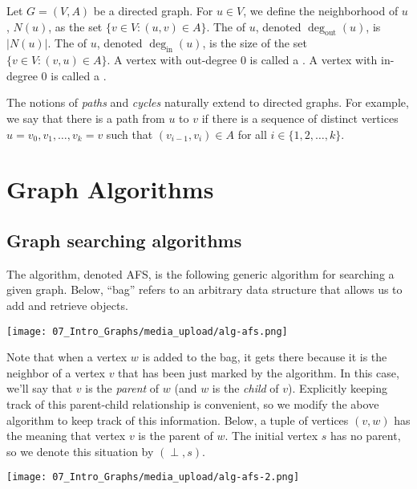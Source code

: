 \begin{definition} \label{definition:Neighborhood-out-degree-in-degree-sink-source} 
Let $G = (V,A)$ be a directed graph. For $u \in V$, we define the neighborhood of $u$, $N(u)$, as the set $\{v \in V : (u,v) \in A\}$. The  of $u$, denoted $\deg_\text{out}(u)$, is $|N(u)|$. The  of $u$, denoted $\deg_\text{in}(u)$, is the size of the set $\{v \in V : (v,u) \in A\}$. A vertex with out-degree 0 is called a . A vertex with in-degree 0 is called a .
\end{definition}


\begin{note} \label{note:Paths-and-cycles-in-directed-graphs}
The notions of \emph{paths} and \emph{cycles} naturally extend to directed graphs. For example, we say that there is a path from $u$ to $v$ if there is a sequence of distinct vertices $u = v_0,v_1,\ldots,v_k = v$ such that $(v_{i-1}, v_i) \in A$ for all $i \in \{1,2,\ldots,k\}$. 
\end{note}





\section{Graph Algorithms}

\subsection{Graph searching algorithms}


\begin{definition} \label{definition:Arbitrary-first-search-AFS-algorithm}
The  algorithm, denoted AFS, is the following generic algorithm for searching a given graph. Below, ``bag'' refers to an arbitrary data structure that allows us to add and retrieve objects. 

\begin{center}
    \texttt{[image: 07\_Intro\_Graphs/media\_upload/alg-afs.png]}
\end{center}

Note that when a vertex $w$ is added to the bag, it gets there because it is the neighbor of a vertex $v$ that has been just marked by the algorithm. In this case, we'll say that $v$ is the \emph{parent} of $w$ (and $w$ is the \emph{child} of $v$). Explicitly keeping track of this parent-child relationship is convenient, so we modify the above algorithm to keep track of this information. Below, a tuple of vertices $(v,w)$ has the meaning that vertex $v$ is the parent of $w$. The initial vertex $s$ has no parent, so we denote this situation by $(\perp, s)$.

\begin{center}
    \texttt{[image: 07\_Intro\_Graphs/media\_upload/alg-afs-2.png]}
\end{center}
\end{definition}


